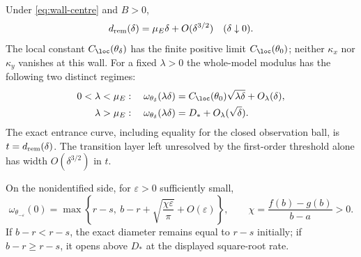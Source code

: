 \begin{theorem}\label{thm:wall}
Under \eqref{eq:wall-centre} and $B>0$,
\begin{equation}\label{eq:entrance-law}
 d_{\rm rem}(\delta)=\mu_E\delta+O(\delta^{3/2})\quad(\delta\downarrow0).
\end{equation}
The local constant $C_{\loc}(\theta_\delta)$ has the finite positive
limit $C_{\loc}(\theta_0)$; neither $\kappa_x$ nor $\kappa_y$ vanishes
at this wall. For a fixed $\lambda>0$ the whole-model modulus has the
following two distinct regimes:
\begin{align}
 0<\lambda<\mu_E:\quad
 \omega_{\theta_\delta}(\lambda\delta)
   &=C_{\loc}(\theta_0)\sqrt{\lambda\delta}+O_\lambda(\delta),
                                                        \label{eq:below-wall}\\
 \lambda>\mu_E:\quad
 \omega_{\theta_\delta}(\lambda\delta)
   &=D_*+O_\lambda(\sqrt\delta).                         \label{eq:above-wall}
\end{align}
The exact entrance curve, including equality for the closed observation
ball, is $t=d_{\rm rem}(\delta)$. The transition layer left unresolved
by the first-order threshold alone has width $O(\delta^{3/2})$ in $t$.

On the nonidentified side, for $\varepsilon>0$ sufficiently small,
\begin{equation}\label{eq:nonident-opening}
 \omega_{\theta_{-\varepsilon}}(0)
 =\max\left\{r-s,\ b-r+\sqrt{\frac{\chi\varepsilon}{\pi}}
                         +O(\varepsilon)\right\},\qquad
 \chi=\frac{f(b)-g(b)}{b-a}>0.
\end{equation}
If $b-r<r-s$, the exact diameter remains equal to $r-s$ initially;
if $b-r\ge r-s$, it opens above $D_*$ at the displayed square-root rate.
\end{theorem}
